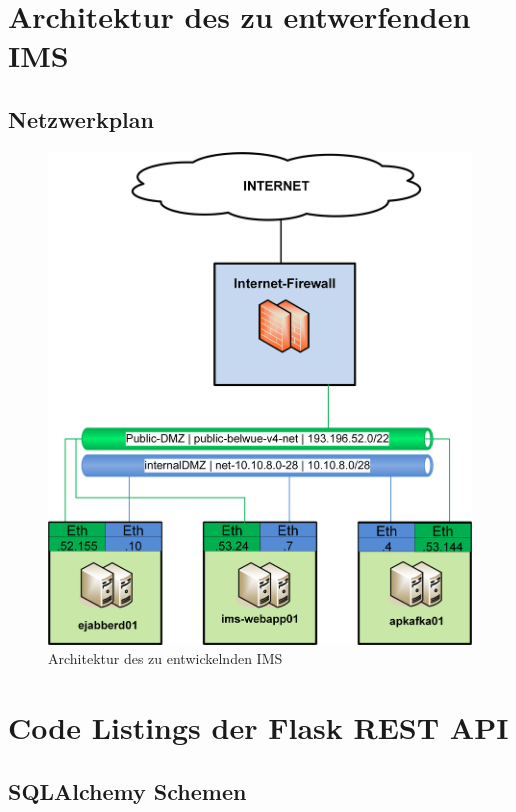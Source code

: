\documentclass[a4paper,titlepage,halfparskip,12pt]{scrreprt}
\begin{document}

\newpage
\appendix
{}

\chapter{Architektur des zu entwerfenden \ac{IMS}}

\section{Netzwerkplan}

\begin{figure}[h]
	\centering
	\includegraphics[width=.95\linewidth]{images/Studienarbeit-Netzwerkplan}
	\caption{Architektur des zu entwickelnden \ac{IMS}}
	\label{img:ArchitekturIMS}
\end{figure}

\chapter{Code Listings der Flask \acs{REST} \acs{API}}

\section{SQLAlchemy Schemen}
\end{document}

